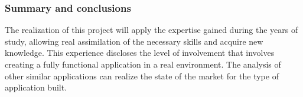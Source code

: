 \begin{frame} [fragile]
	\frametitle{Summary and conclusions}
		The realization of this project will apply the expertise gained during the years of study, allowing real assimilation of the necessary skills and acquire new knowledge. This experience discloses the level of involvement that involves creating a fully functional application in a real environment. The analysis of other similar applications can realize the state of the market for the type of application built.
	\endblock{}
\end{frame}